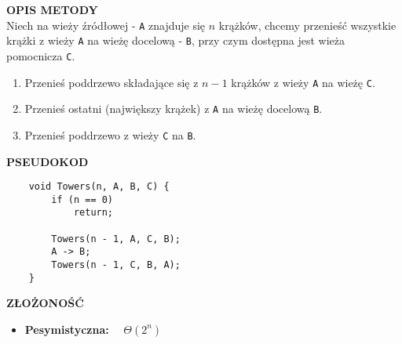 \documentclass[../algorytmy.tex]{subfiles}
\begin{document}
    \textbf{OPIS METODY}\\

    Niech na wieży źródłowej - \texttt{A} znajduje się $n$ krążków, chcemy
    przenieść wszystkie krążki z wieży \texttt{A} na wieżę docelową -
    \texttt{B}, przy czym dostępna jest wieża pomocnicza \texttt{C}.

    \begin{enumerate}
        \item Przenieś poddrzewo składające się z $n-1$ krążków z wieży
            \texttt{A} na wieżę \texttt{C}.
        \item Przenieś ostatni (największy krążek) z \texttt{A} na wieżę
            docelową \texttt{B}.
        \item Przenieś poddrzewo z wieży \texttt{C} na \texttt{B}.
    \end{enumerate}

    \textbf{PSEUDOKOD}
    \begin{verbatim}
    void Towers(n, A, B, C) {
        if (n == 0)
            return;

        Towers(n - 1, A, C, B);
        A -> B;
        Towers(n - 1, C, B, A);
    }
    \end{verbatim}

    \textbf{ZŁOŻONOŚĆ}
    \begin{itemize}
        \item \textbf{Pesymistyczna:} ~~$\Theta(2^n)$
    \end{itemize}

\end{document}
